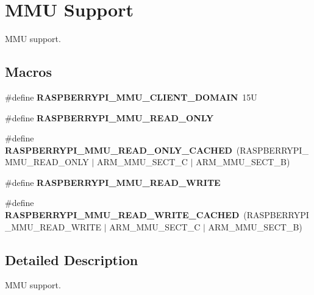\hypertarget{group__raspberrypi__mmu}{}\section{M\+MU Support}
\label{group__raspberrypi__mmu}


M\+MU support.  


\subsection*{Macros}
\begin{DoxyCompactItemize}
\item 
\mbox{\label{group__raspberrypi__mmu_gaffbfa558c2a5d013832ba6c3f04d7c00}} 
\#define {\bfseries R\+A\+S\+P\+B\+E\+R\+R\+Y\+P\+I\+\_\+\+M\+M\+U\+\_\+\+C\+L\+I\+E\+N\+T\+\_\+\+D\+O\+M\+A\+IN}~15U
\item 
\#define {\bfseries R\+A\+S\+P\+B\+E\+R\+R\+Y\+P\+I\+\_\+\+M\+M\+U\+\_\+\+R\+E\+A\+D\+\_\+\+O\+N\+LY}
\item 
\mbox{\label{group__raspberrypi__mmu_ga2da9825e5177184ea2cd7e2f094383ed}} 
\#define {\bfseries R\+A\+S\+P\+B\+E\+R\+R\+Y\+P\+I\+\_\+\+M\+M\+U\+\_\+\+R\+E\+A\+D\+\_\+\+O\+N\+L\+Y\+\_\+\+C\+A\+C\+H\+ED}~(R\+A\+S\+P\+B\+E\+R\+R\+Y\+P\+I\+\_\+\+M\+M\+U\+\_\+\+R\+E\+A\+D\+\_\+\+O\+N\+LY $\vert$ A\+R\+M\+\_\+\+M\+M\+U\+\_\+\+S\+E\+C\+T\+\_\+C $\vert$ A\+R\+M\+\_\+\+M\+M\+U\+\_\+\+S\+E\+C\+T\+\_\+B)
\item 
\#define {\bfseries R\+A\+S\+P\+B\+E\+R\+R\+Y\+P\+I\+\_\+\+M\+M\+U\+\_\+\+R\+E\+A\+D\+\_\+\+W\+R\+I\+TE}
\item 
\mbox{\label{group__raspberrypi__mmu_ga6a09080cc3a7f7ded5c05afa989bee39}} 
\#define {\bfseries R\+A\+S\+P\+B\+E\+R\+R\+Y\+P\+I\+\_\+\+M\+M\+U\+\_\+\+R\+E\+A\+D\+\_\+\+W\+R\+I\+T\+E\+\_\+\+C\+A\+C\+H\+ED}~(R\+A\+S\+P\+B\+E\+R\+R\+Y\+P\+I\+\_\+\+M\+M\+U\+\_\+\+R\+E\+A\+D\+\_\+\+W\+R\+I\+TE $\vert$ A\+R\+M\+\_\+\+M\+M\+U\+\_\+\+S\+E\+C\+T\+\_\+C $\vert$ A\+R\+M\+\_\+\+M\+M\+U\+\_\+\+S\+E\+C\+T\+\_\+B)
\end{DoxyCompactItemize}


\subsection{Detailed Description}
M\+MU support. 



